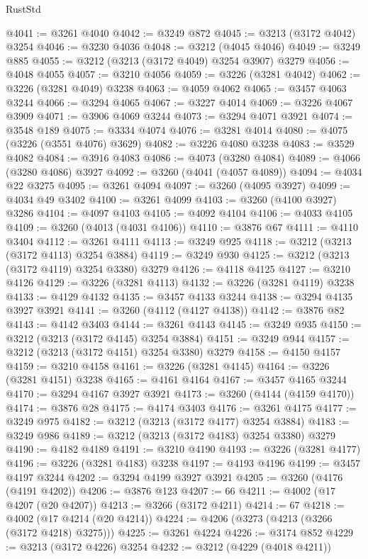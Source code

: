 \begin{lexlean}{RustStd}
\begin{coremodule}
{\begin{coremodule}
{{{{{{{{{{{{{{{{{{{{{{{{{{@4041 := @3261 @4040
@4042 := @3249 @872
@4045 := @3213 (@3172 @4042) @3254
@4046 := @3230 @4036
@4048 := @3212 (@4045 @4046)
@4049 := @3249 @885
@4055 := @3212 (@3213 (@3172 @4049) @3254 @3907) @3279
@4056 := @4048 @4055
@4057 := @3210 @4056
@4059 := @3226 (@3281 @4042)
@4062 := @3226 (@3281 @4049) @3238
@4063 := @4059 @4062
@4065 := @3457 @4063 @3244
@4066 := @3294 @4065
@4067 := @3227 @4014
@4069 := @3226 @4067 @3909
@4071 := @3906 @4069 @3244
@4073 := @3294 @4071 @3921
@4074 := @3548 @189
@4075 := @3334 @4074
@4076 := @3281 @4014
@4080 := @4075 (@3226 (@3551 @4076) @3629)
@4082 := @3226 @4080 @3238
@4083 := @3529 @4082
@4084 := @3916 @4083
@4086 := @4073 (@3280 @4084)
@4089 := @4066 (@3280 @4086) @3927
@4092 := @3260 (@4041 (@4057 @4089))
@4094 := @4034 @22 @3275
@4095 := @3261 @4094
@4097 := @3260 (@4095 @3927)
@4099 := @4034 @49 @3402
@4100 := @3261 @4099
@4103 := @3260 (@4100 @3927) @3286
@4104 := @4097 @4103
@4105 := @4092 @4104
@4106 := @4033 @4105
@4109 := @3260 (@4013 (@4031 @4106))
@4110 := @3876 @67
@4111 := @4110 @3404
@4112 := @3261 @4111
@4113 := @3249 @925
@4118 := @3212 (@3213 (@3172 @4113) @3254 @3884)
@4119 := @3249 @930
@4125 := @3212 (@3213 (@3172 @4119) @3254 @3380) @3279
@4126 := @4118 @4125
@4127 := @3210 @4126
@4129 := @3226 (@3281 @4113)
@4132 := @3226 (@3281 @4119) @3238
@4133 := @4129 @4132
@4135 := @3457 @4133 @3244
@4138 := @3294 @4135 @3927 @3921
@4141 := @3260 (@4112 (@4127 @4138))
@4142 := @3876 @82
@4143 := @4142 @3403
@4144 := @3261 @4143
@4145 := @3249 @935
@4150 := @3212 (@3213 (@3172 @4145) @3254 @3884)
@4151 := @3249 @944
@4157 := @3212 (@3213 (@3172 @4151) @3254 @3380) @3279
@4158 := @4150 @4157
@4159 := @3210 @4158
@4161 := @3226 (@3281 @4145)
@4164 := @3226 (@3281 @4151) @3238
@4165 := @4161 @4164
@4167 := @3457 @4165 @3244
@4170 := @3294 @4167 @3927 @3921
@4173 := @3260 (@4144 (@4159 @4170))
@4174 := @3876 @28
@4175 := @4174 @3403
@4176 := @3261 @4175
@4177 := @3249 @975
@4182 := @3212 (@3213 (@3172 @4177) @3254 @3884)
@4183 := @3249 @986
@4189 := @3212 (@3213 (@3172 @4183) @3254 @3380) @3279
@4190 := @4182 @4189
@4191 := @3210 @4190
@4193 := @3226 (@3281 @4177)
@4196 := @3226 (@3281 @4183) @3238
@4197 := @4193 @4196
@4199 := @3457 @4197 @3244
@4202 := @3294 @4199 @3927 @3921
@4205 := @3260 (@4176 (@4191 @4202))
@4206 := @3876 @123
@4207 := 66
@4211 := @4002 (@17 @4207 (@20 @4207))
@4213 := @3266 (@3172 @4211)
@4214 := 67
@4218 := @4002 (@17 @4214 (@20 @4214))
@4224 := @4206 (@3273 (@4213 (@3266 (@3172 @4218) @3275)))
@4225 := @3261 @4224
@4226 := @3174 @852
@4229 := @3213 (@3172 @4226) @3254
@4232 := @3212 (@4229 (@4018 @4211))
}}}}}}}}}}}}}}}}}}}}}}}}}}
\end{coremodule}}
\end{coremodule}
\end{lexlean}

